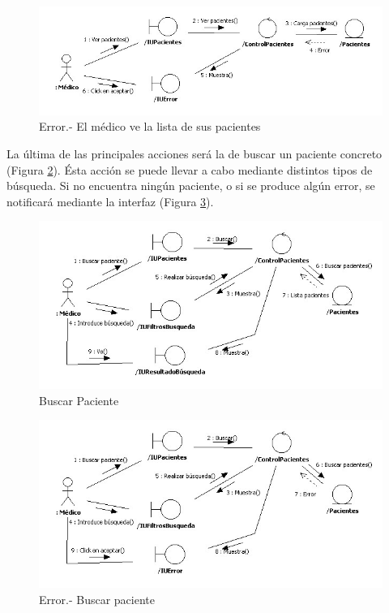 \documentclass[a4paper,oneside,11pt]{book}
\begin{document}
			\begin{figure}[H]
			  \centering
			    \includegraphics[width=16cm]{img/jpg/colaboraciones/14_VerTodosPacientesError.jpg}
			  \caption{Error.- El médico ve la lista de sus pacientes}
			  \label{fig:col_ver_pacientes_medico_err}
			\end{figure}
			
			La última de las principales acciones será la de buscar un paciente concreto (Figura \ref{fig:col_buscarpaciente_medico}). Ésta acción se puede llevar a cabo mediante distintos tipos de búsqueda. Si no encuentra ningún paciente, o si se produce algún error, se notificará mediante la interfaz (Figura \ref{fig:col_buscarpaciente_medico_err}).
			
			\begin{figure}[H]
			  \centering
			    \includegraphics[width=16cm]{img/jpg/colaboraciones/15_BuscarPaciente.jpg}
			  \caption{Buscar Paciente}
			  \label{fig:col_buscarpaciente_medico}
			\end{figure}
			
			\begin{figure}[H]
			  \centering
			    \includegraphics[width=16cm]{img/jpg/colaboraciones/16_BuscarPacienteError.jpg}
			  \caption{Error.- Buscar paciente}
			  \label{fig:col_buscarpaciente_medico_err}
			\end{figure}
			
\end{document}
